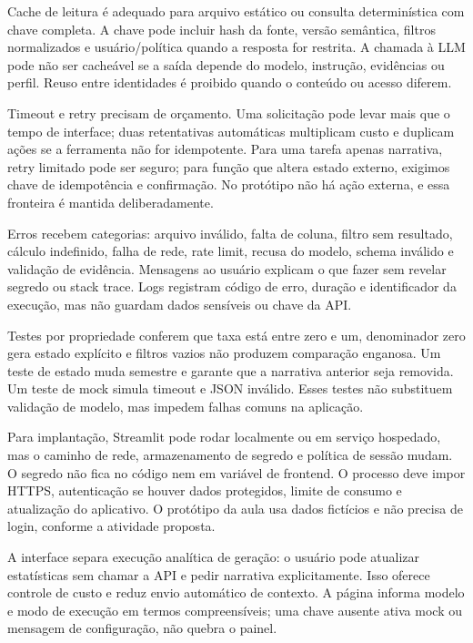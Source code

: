 Cache de leitura é adequado para arquivo estático ou consulta determinística com chave completa. A chave pode incluir hash da fonte, versão semântica, filtros normalizados e usuário/política quando a resposta for restrita. A chamada à LLM pode não ser cacheável se a saída depende do modelo, instrução, evidências ou perfil. Reuso entre identidades é proibido quando o conteúdo ou acesso diferem.

Timeout e retry precisam de orçamento. Uma solicitação pode levar mais que o tempo de interface; duas retentativas automáticas multiplicam custo e duplicam ações se a ferramenta não for idempotente. Para uma tarefa apenas narrativa, retry limitado pode ser seguro; para função que altera estado externo, exigimos chave de idempotência e confirmação. No protótipo não há ação externa, e essa fronteira é mantida deliberadamente.

Erros recebem categorias: arquivo inválido, falta de coluna, filtro sem resultado, cálculo indefinido, falha de rede, rate limit, recusa do modelo, schema inválido e validação de evidência. Mensagens ao usuário explicam o que fazer sem revelar segredo ou stack trace. Logs registram código de erro, duração e identificador da execução, mas não guardam dados sensíveis ou chave da API.

Testes por propriedade conferem que taxa está entre zero e um, denominador zero gera estado explícito e filtros vazios não produzem comparação enganosa. Um teste de estado muda semestre e garante que a narrativa anterior seja removida. Um teste de mock simula timeout e JSON inválido. Esses testes não substituem validação de modelo, mas impedem falhas comuns na aplicação.

Para implantação, Streamlit pode rodar localmente ou em serviço hospedado, mas o caminho de rede, armazenamento de segredo e política de sessão mudam. O segredo não fica no código nem em variável de frontend. O processo deve impor HTTPS, autenticação se houver dados protegidos, limite de consumo e atualização do aplicativo. O protótipo da aula usa dados fictícios e não precisa de login, conforme a atividade proposta.

A interface separa execução analítica de geração: o usuário pode atualizar estatísticas sem chamar a API e pedir narrativa explicitamente. Isso oferece controle de custo e reduz envio automático de contexto. A página informa modelo e modo de execução em termos compreensíveis; uma chave ausente ativa mock ou mensagem de configuração, não quebra o painel.

